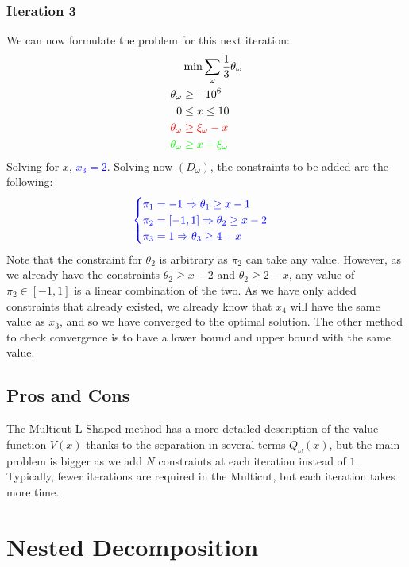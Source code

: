 \documentclass[12pt, openany]{report}
\theoremstyle{definition}
\begin{document}
\subsection{Iteration 3}
We can now formulate the problem for this next iteration:
\begin{equation}
	\begin{aligned}
		&\min \sum_\omega \frac{1}{3}\theta_\omega \\
		\theta_\omega &\ge -10^6\\
		0&\le x\le 10\\
		\color{red} \theta_\omega &\color{red}\ge \xi_\omega-x\\
		\color{green}\theta_\omega &\color{green} \ge x-\xi_\omega \color{black}
	\end{aligned}
\end{equation}
Solving for $x$, \textcolor{blue}{$x_3=2$}. Solving now $(D_\omega)$, the constraints to be added are the following:
\begin{equation}
	\color{blue}
	\begin{cases}
		\pi_1 =-1  \Rightarrow \theta_1 \ge x-1 \\
		\pi_2 = [-1,1] \Rightarrow \theta_2 \ge x-2\\
		\pi_3 = 1 \Rightarrow \theta_3 \ge 4-x\\
	\end{cases}\color{black}
\end{equation}
Note that the constraint for $\theta_2$ is arbitrary as $\pi_2$ can take any value. However, as we already have the constraints $\theta_2 \ge x-2$ and $\theta_2\ge 2-x$, any value of $\pi_2\in [-1,1]$ is a linear combination of the two. As we have only added constraints that already existed, we already know that $x_4$ will have the same value as $x_3$, and so we have converged to the optimal solution. The other method to check convergence is to have a lower bound and upper bound with the same value. 
\section{Pros and Cons}
The Multicut L-Shaped method has a more detailed description of the value function $V(x)$ thanks to the separation in several terms $Q_\omega(x)$, but the main problem is bigger as we add $N$ constraints at each iteration instead of $1$. Typically, fewer iterations are required in the Multicut, but each iteration takes more time. 
\chapter{Nested Decomposition}
\end{document}
